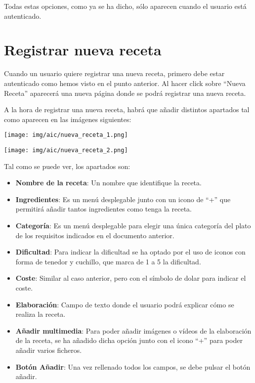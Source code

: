\documentclass{\ClassPath/viu-tfm-template}
\begin{document}
Todas estas opciones, como ya se ha dicho, sólo aparecen cuando el usuario está autenticado.


\section{Registrar nueva receta}

Cuando un usuario quiere registrar una nueva receta, primero debe estar autenticado como hemos visto en el punto anterior. Al hacer click sobre “{\color{maincolor}Nueva Receta}” aparecerá una nueva página donde se podrá registrar una nueva receta.

A la hora de registrar una nueva receta, habrá que añadir distintos apartados tal como aparecen en las imágenes siguientes:


    \begin{center}
        \vspace{-10pt}
        \texttt{[image: img/aic/nueva\_receta\_1.png]}
        \vspace{-20pt}
    \end{center}

    \begin{center}
        \vspace{-10pt}
        \texttt{[image: img/aic/nueva\_receta\_2.png]}
        \vspace{-20pt}
    \end{center}

Tal como se puede ver, los apartados son:

\begin{itemize}
    \item \textbf{Nombre de la receta}: Un nombre que identifique la receta.
    \item \textbf{Ingredientes}: Es un menú desplegable junto con un icono de “+” que permitirá añadir tantos ingredientes como tenga la receta.
    \item \textbf{Categoría}: Es un menú desplegable para elegir una única categoría del plato de los requisitos indicados en el documento anterior.
    \item \textbf{Dificultad}: Para indicar la dificultad se ha optado por el uso de iconos con forma de tenedor y cuchillo, que marca de 1 a 5 la dificultad.
    \item \textbf{Coste}: Similar al caso anterior, pero con el símbolo de dolar para indicar el coste.
    \item \textbf{Elaboración}: Campo de texto donde el usuario podrá explicar cómo se realiza la receta.
    \item \textbf{Añadir multimedia}: Para poder añadir imágenes o vídeos de  la elaboración de la receta, se ha añadido dicha opción junto con el icono “+” para poder añadir varios ficheros.
    \item \textbf{Botón Añadir}: Una vez rellenado todos los campos, se debe pulsar el botón añadir.
\end{itemize}
\end{document}

